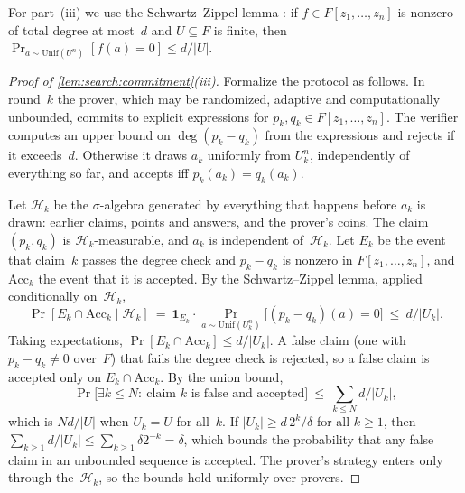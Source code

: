 For part~(iii) we use the Schwartz--Zippel lemma \citep{schwartz1980fast,zippel1979probabilistic,demillo1978probabilistic}: if $f\in F[z_1,\dots,z_n]$ is nonzero of total degree at most~$d$ and $U\subseteq F$ is finite, then $\Pr_{a\sim\mathrm{Unif}(U^n)}[f(a)=0]\le d/|U|$.

\begin{proof}[Proof of \cref{lem:search:commitment}(iii)]
Formalize the protocol as follows. In round~$k$ the prover, which may be randomized, adaptive and computationally unbounded, commits to explicit expressions for $p_k,q_k\in F[z_1,\dots,z_n]$. The verifier computes an upper bound on $\deg(p_k-q_k)$ from the expressions and rejects if it exceeds~$d$. Otherwise it draws $a_k$ uniformly from $U_k^n$, independently of everything so far, and accepts iff $p_k(a_k)=q_k(a_k)$.

Let $\mathcal H_k$ be the $\sigma$-algebra generated by everything that happens before $a_k$ is drawn: earlier claims, points and answers, and the prover's coins. The claim $(p_k,q_k)$ is $\mathcal H_k$-measurable, and $a_k$ is independent of~$\mathcal H_k$. Let $E_k$ be the event that claim~$k$ passes the degree check and $p_k-q_k$ is nonzero in $F[z_1,\dots,z_n]$, and $\mathrm{Acc}_k$ the event that it is accepted. By the Schwartz--Zippel lemma, applied conditionally on~$\mathcal H_k$,
\[
\Pr[E_k\cap\mathrm{Acc}_k\mid\mathcal H_k]\ =\ \mathbf 1_{E_k}\cdot\Pr_{a\sim\mathrm{Unif}(U_k^n)}\big[(p_k-q_k)(a)=0\big]\ \le\ d/|U_k| .
\]
Taking expectations, $\Pr[E_k\cap\mathrm{Acc}_k]\le d/|U_k|$. A false claim (one with $p_k-q_k\neq0$ over~$F$) that fails the degree check is rejected, so a false claim is accepted only on $E_k\cap\mathrm{Acc}_k$. By the union bound,
\[
\Pr\big[\exists k\le N:\ \text{claim $k$ is false and accepted}\big]\ \le\ \sum_{k\le N}d/|U_k| ,
\]
which is $Nd/|U|$ when $U_k=U$ for all~$k$. If $|U_k|\ge d\,2^k/\delta$ for all $k\ge1$, then $\sum_{k\ge1}d/|U_k|\le\sum_{k\ge1}\delta2^{-k}=\delta$, which bounds the probability that any false claim in an unbounded sequence is accepted. The prover's strategy enters only through the~$\mathcal H_k$, so the bounds hold uniformly over provers.
\end{proof}

